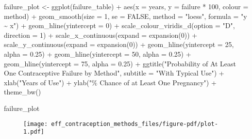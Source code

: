 \documentclass[
  letterpaper,
  DIV=11,
  numbers=noendperiod]{scrartcl}
\newenvironment{Shaded}{\begin{snugshade}}{\end{snugshade}}
\newcommand{\AttributeTok}[1]{\textcolor[rgb]{0.40,0.46,0.14}{#1}}
\newcommand{\ConstantTok}[1]{\textcolor[rgb]{0.56,0.35,0.01}{#1}}
\newcommand{\DecValTok}[1]{\textcolor[rgb]{0.68,0.00,0.00}{#1}}
\newcommand{\FloatTok}[1]{\textcolor[rgb]{0.68,0.00,0.00}{#1}}
\newcommand{\FunctionTok}[1]{\textcolor[rgb]{0.28,0.35,0.67}{#1}}
\newcommand{\NormalTok}[1]{\textcolor[rgb]{0.00,0.46,0.62}{#1}}
\newcommand{\OtherTok}[1]{\textcolor[rgb]{0.00,0.46,0.62}{#1}}
\newcommand{\SpecialCharTok}[1]{\textcolor[rgb]{0.37,0.37,0.37}{#1}}
\newcommand{\StringTok}[1]{\textcolor[rgb]{0.13,0.47,0.30}{#1}}
\begin{document}
\begin{Shaded}
\begin{Highlighting}[]
\NormalTok{failure\_plot }\OtherTok{\textless{}{-}} \FunctionTok{ggplot}\NormalTok{(failure\_table) }\SpecialCharTok{+}
    \FunctionTok{aes}\NormalTok{(}\AttributeTok{x =}\NormalTok{ years, }\AttributeTok{y =}\NormalTok{ failure }\SpecialCharTok{*} \DecValTok{100}\NormalTok{, }\AttributeTok{colour =}\NormalTok{ method) }\SpecialCharTok{+}
    \FunctionTok{geom\_smooth}\NormalTok{(}\AttributeTok{size =} \DecValTok{1}\NormalTok{, }\AttributeTok{se =} \ConstantTok{FALSE}\NormalTok{, }\AttributeTok{method =} \StringTok{"loess"}\NormalTok{, }\AttributeTok{formula =} \StringTok{"y \textasciitilde{} x"}\NormalTok{) }\SpecialCharTok{+}
    \FunctionTok{geom\_hline}\NormalTok{(}\AttributeTok{yintercept =} \DecValTok{0}\NormalTok{) }\SpecialCharTok{+}
    \FunctionTok{scale\_colour\_viridis\_d}\NormalTok{(}\AttributeTok{option =} \StringTok{"D"}\NormalTok{, }\AttributeTok{direction =} \DecValTok{1}\NormalTok{) }\SpecialCharTok{+}
    \FunctionTok{scale\_x\_continuous}\NormalTok{(}\AttributeTok{expand =} \FunctionTok{expansion}\NormalTok{(}\DecValTok{0}\NormalTok{)) }\SpecialCharTok{+} 
    \FunctionTok{scale\_y\_continuous}\NormalTok{(}\AttributeTok{expand =} \FunctionTok{expansion}\NormalTok{(}\DecValTok{0}\NormalTok{)) }\SpecialCharTok{+}
    \FunctionTok{geom\_hline}\NormalTok{(}\AttributeTok{yintercept =} \DecValTok{25}\NormalTok{, }\AttributeTok{alpha =} \FloatTok{0.25}\NormalTok{) }\SpecialCharTok{+}
    \FunctionTok{geom\_hline}\NormalTok{(}\AttributeTok{yintercept =} \DecValTok{50}\NormalTok{, }\AttributeTok{alpha =} \FloatTok{0.25}\NormalTok{) }\SpecialCharTok{+}
    \FunctionTok{geom\_hline}\NormalTok{(}\AttributeTok{yintercept =} \DecValTok{75}\NormalTok{, }\AttributeTok{alpha =} \FloatTok{0.25}\NormalTok{) }\SpecialCharTok{+}
    \FunctionTok{ggtitle}\NormalTok{(}\StringTok{"Probability of At Least One Contraceptive Failure by Method"}\NormalTok{, }\AttributeTok{subtitle =} \StringTok{"With Typical Use"}\NormalTok{) }\SpecialCharTok{+}
    \FunctionTok{xlab}\NormalTok{(}\StringTok{"Years of Use"}\NormalTok{) }\SpecialCharTok{+}
    \FunctionTok{ylab}\NormalTok{(}\StringTok{"\% Chance of at Least One Pregnancy"}\NormalTok{) }\SpecialCharTok{+}
    \FunctionTok{theme\_bw}\NormalTok{()}

\NormalTok{failure\_plot}
\end{Highlighting}
\end{Shaded}

\begin{figure}[H]

{\centering \texttt{[image: eff\_contraception\_methods\_files/figure-pdf/plot-1.pdf]}

}

\end{figure}
\end{document}
